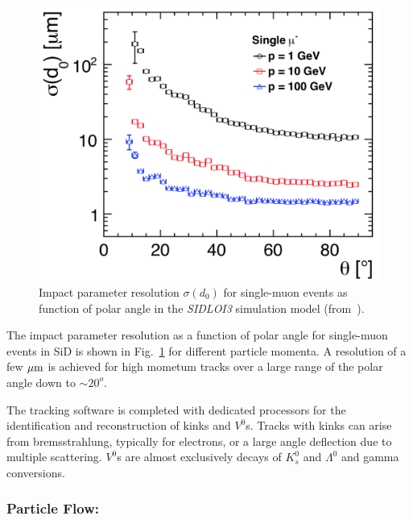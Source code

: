 \begin{figure}
\begin{center}
\includegraphics[width=0.85\hsize]{chapters/figures/SiD_D0_resolution.png}
\end{center}
\caption{Impact parameter resolution $\sigma(d_0)$ for single-muon events as function of polar angle
  in the \emph{SIDLOI3} simulation model (from~\cite{Behnke:2013lya}).} 
\label{fig:sid_d0_res}
\end{figure}

The impact parameter resolution as a function of polar angle for single-muon events in SiD is shown in Fig.~\ref{fig:sid_d0_res} for
different particle momenta. A resolution of a few $\mu\rm{m}$ is achieved for high mometum tracks over a large range of the polar
angle down to $\sim 20^{o}$.


The tracking software is completed with dedicated processors for the identification and reconstruction of kinks and $V^0$s.
Tracks with kinks can arise from bremsstrahlung, typically for electrons, or a large angle deflection due to multiple scattering.
$V^0$s are almost exclusively decays of $K^0_s$ and $\Lambda^0$ and gamma conversions.


\subsubsection{Particle Flow:} 

